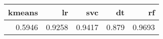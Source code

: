 \begin{tabular}{rrrrr}
\toprule
 kmeans &      lr &     svc &     dt &      rf \\
\midrule
 0.5946 &  0.9258 &  0.9417 &  0.879 &  0.9693 \\
\bottomrule
\end{tabular}

